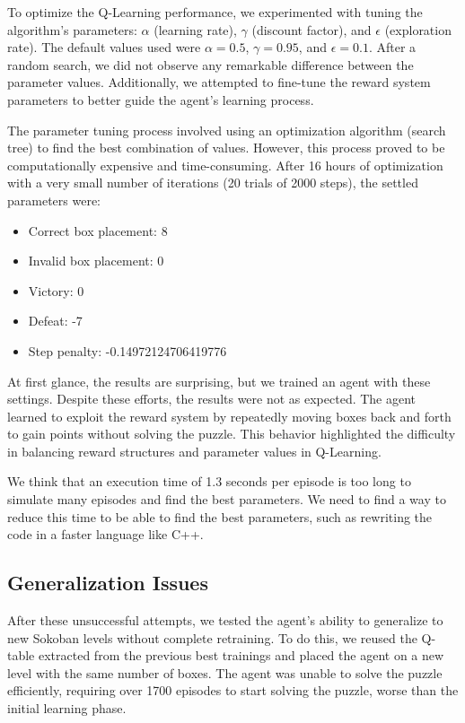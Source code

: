 \documentclass[10pt,twocolumn]{article}
\begin{document}
To optimize the Q-Learning performance, we experimented with tuning the algorithm's parameters: $\alpha$ (learning rate), $\gamma$ (discount factor), and $\epsilon$ (exploration rate). The default values used were $\alpha = 0.5$, $\gamma = 0.95$, and $\epsilon = 0.1$. After a random search, we did not observe any remarkable difference between the parameter values. Additionally, we attempted to fine-tune the reward system parameters to better guide the agent's learning process.

The parameter tuning process involved using an optimization algorithm (search tree) to find the best combination of values. However, this process proved to be computationally expensive and time-consuming. After 16 hours of optimization with a very small number of iterations (20 trials of 2000 steps), the settled parameters were:

\begin{itemize}
    \item Correct box placement: 8
    \item Invalid box placement: 0
    \item Victory: 0
    \item Defeat: -7
    \item Step penalty: -0.14972124706419776
\end{itemize}

At first glance, the results are surprising, but we trained an agent with these settings. Despite these efforts, the results were not as expected. The agent learned to exploit the reward system by repeatedly moving boxes back and forth to gain points without solving the puzzle. This behavior highlighted the difficulty in balancing reward structures and parameter values in Q-Learning.

We think that an execution time of 1.3 seconds per episode is too long to simulate many episodes and find the best parameters. We need to find a way to reduce this time to be able to find the best parameters, such as rewriting the code in a faster language like C++.

\subsection{Generalization Issues}

After these unsuccessful attempts, we tested the agent's ability to generalize to new Sokoban levels without complete retraining. To do this, we reused the Q-table extracted from the previous best trainings and placed the agent on a new level with the same number of boxes. The agent was unable to solve the puzzle efficiently, requiring over 1700 episodes to start solving the puzzle, worse than the initial learning phase.
\end{document}
